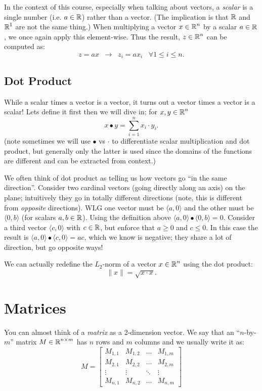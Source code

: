In the context of this course, especially when talking about vectors, a \emph{scalar} is a single number (i.e. $a \in \operatorname{\mathbb{R}}$) rather than a vector. 
(The implication is that $\operatorname{\mathbb{R}}$ and $\operatorname{\mathbb{R}}^1$ are not the same thing.)
When multiplying a vector $x\in \operatorname{\mathbb{R}}^n$ by a scalar $a\in\operatorname{\mathbb{R}}$, we once again apply this element-wise. 
Thus the result, $z\in\operatorname{\mathbb{R}}^n$ can be computed as:
\[
z = ax \;\; \rightarrow \;\; z_i = a x_i \;\;\; \forall 1 \le i \le n.
\]


\subsection{Dot Product}
While a scalar times a vector is a vector, it turns out a vector times a vector is a scalar! 
Lets define it first then we will dive in;
for $x,y \in \operatorname{\mathbb{R}}^n$
\[
x \bullet y = \sum_{i=1}^n x_i \cdot y_i.
\]
(note sometimes we will use $\bullet$ vs $\cdot$ to differentiate scalar multiplication and dot product, but generally only the latter is used since the domains of the functions are different and can be extracted from context.)

We often think of dot product as telling us how vectors go ``in the same direction''. 
Consider two cardinal vectors (going directly along an axis) on the plane;
intuitively they go in totally different directions (note, this is different from \textit{opposite} directions). 
WLG one vector must be $\langle a, 0 \rangle$ and the other must be  $\langle 0,b \rangle$ (for scalars $a,b\in\operatorname{\mathbb{R}}$). 
Using the definition above $\langle a, 0 \rangle \bullet \langle 0,b \rangle = 0$.
Consider a third vector $\langle c, 0 \rangle$ with $c\in\operatorname{\mathbb{R}}$, but enforce that $a \ge 0$ and $c \le 0$. 
In this case the result is $\langle a, 0 \rangle \bullet \langle c,0 \rangle = ac$, which we know is negative; 
they share a lot of direction, but go opposite ways! 

We can actually redefine the $L_2$-norm of a vector $x\in\operatorname{\mathbb{R}}^n$ using the dot product:
\[
\|x\| = \sqrt{x \cdot x}.
\]
\section{Matrices}
You can almost think of a \emph{matrix} as a 2-dimension vector. 
We say that an ``$n$-by-$m$'' matrix $M \in \operatorname{\mathbb{R}}^{n\times m}$ has $n$ rows and $m$ columns and we usually write it as:
\[
M = \left[\begin{matrix}
M_{1,1}& 	M_{1,2}& 	\dots& M_{1,m}\\
M_{2,1}& 	M_{2,2}& 	\dots& M_{2,m}\\ 
\vdots & \vdots & \ddots & \vdots \\ 
M_{n,1}& 	M_{n,2}& 	\dots& M_{n,m}
\end{matrix}\right]
\]

